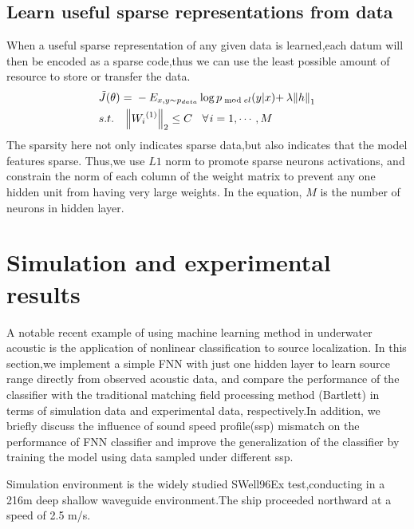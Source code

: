 \subsection{Learn useful sparse representations from data}
When a useful sparse representation of any given data is learned,each datum will then be encoded as a sparse code,thus we can use the least possible amount of resource to store or transfer the data.
\begin{equation}
\begin{split}
&\tilde J(\theta ){\kern 1pt} {\kern 1pt} {\kern 1pt} {\rm{ = }}{\kern 1pt} {\kern 1pt} {\kern 1pt}  - {E_{x,y \sim {p_{data}}}}\log {p_{\bmod el}}(y|x){\rm{ + }}{\kern 1pt} {\kern 1pt} \lambda {\left\| h \right\|_1}\\
& s.t.{\kern 1pt} {\kern 1pt} {\kern 1pt} {\kern 1pt} {\kern 1pt} {\kern 1pt} {\kern 1pt} {\kern 1pt} {\kern 1pt} {\kern 1pt} {\left\| {{W_i}^{(1)}} \right\|_2} \le C{\kern 1pt} {\kern 1pt} {\kern 1pt} {\kern 1pt} {\kern 1pt} {\kern 1pt} {\kern 1pt} {\kern 1pt} {\kern 1pt} \forall {\kern 1pt} i = 1, \cdots ,M\\
\end{split}
\end{equation}
The sparsity here not only indicates sparse data,but also indicates that the model features sparse. Thus,we use $L1$ norm to promote sparse neurons activations, and constrain the norm of each column of the weight matrix to prevent any one hidden unit from having very large weights. In the equation, $M$ is the number of neurons in hidden layer.

\section{Simulation and experimental results}
A notable recent example of using machine learning method in underwater acoustic is the application of nonlinear classification to source localization\cite{niu2017source}.
In this section,we implement a simple FNN with just one hidden layer to learn source range directly from observed acoustic data, 
and compare the performance of the classifier with the traditional matching field processing method (Bartlett) in terms of simulation data and experimental data, respectively.In addition, we briefly discuss the influence of sound speed profile(ssp) mismatch on the performance of FNN classifier and improve the generalization of the classifier by training the model using data sampled under different ssp.

Simulation environment is the widely studied SWell96Ex test,conducting in a 216m deep shallow waveguide environment.The ship proceeded northward at a speed of 2.5 m/s.

